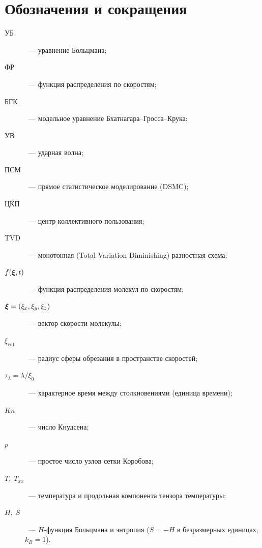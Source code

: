 \chapter*{Обозначения и сокращения}

\begin{description}
  \item[УБ]~--- уравнение Больцмана;
  \item[ФР]~--- функция распределения по скоростям;
  \item[БГК]~--- модельное уравнение Бхатнагара--Гросса--Крука;
  \item[УВ]~--- ударная волна;
  \item[ПСМ]~--- прямое статистическое моделирование (DSMC);
  \item[ЦКП]~--- центр коллективного пользования;
  \item[TVD]~--- монотонная (Total Variation Diminishing) разностная схема;
  \item[$f(\boldsymbol{\xi},t)$]~--- функция распределения молекул по скоростям;
  \item[$\boldsymbol{\xi}=(\xi_x,\xi_y,\xi_z)$]~--- вектор скорости молекулы;
  \item[$\xi_{\mathrm{cut}}$]~--- радиус сферы обрезания в пространстве скоростей;
  \item[$\tau_\lambda=\lambda/\xi_0$]~--- характерное время между столкновениями (единица времени);
  \item[$Kn$]~--- число Кнудсена;
  \item[$p$]~--- простое число узлов сетки Коробова;
  \item[$T,\;T_{xx}$]~--- температура и продольная компонента тензора температуры;
  \item[$H,\;S$]~--- $H$-функция Больцмана и энтропия ($S=-H$ в безразмерных единицах, $k_B=1$).
\end{description}
